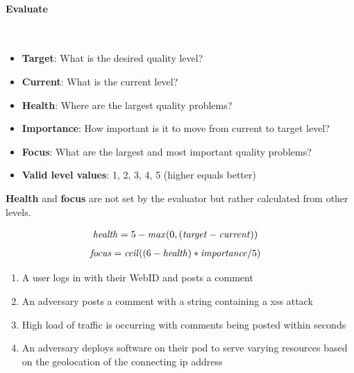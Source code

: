 \paragraph{Evaluate}\mbox{}\\

\begin{itemize}
    \item \textbf{Target}: What is the desired quality level?
    \item \textbf{Current}: What is the current level?
    \item \textbf{Health}: Where are the largest quality problems?
    \item \textbf{Importance}: How important is it to move from current to target level?
    \item \textbf{Focus}: What are the largest and most important quality problems?
    \item \textbf{Valid level values}: 1, 2, 3, 4, 5 (higher equals better)
\end{itemize}

\textbf{Health} and \textbf{focus} are not set by the evaluator but rather calculated from other levels.

\begin{align*}
    \text{\textit{health}}&=5 - \text{\textit{max}}(0, (\text{\textit{target}} - \text{\textit{current}}))
\end{align*}
\vspace{-5mm}
\begin{align*}
    \text{\textit{focus}}&= \text{\textit{ceil}}((6 - \text{\textit{health}}) * \text{\textit{importance}}/5)
\end{align*}

\begin{enumerate}
    \item A user logs in with their WebID and posts a comment
    \item An adversary posts a comment with a string containing a \gls{xss} attack
    \item High load of traffic is occurring with comments being posted within seconds
    \item An adversary deploys software on their pod to serve varying resources based on the geolocation of the connecting \gls{ip} address
\end{enumerate}

